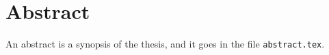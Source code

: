 
\chapter*{Abstract}

An abstract is a synopsis of the thesis, and it goes in the
file \verb!abstract.tex!.
